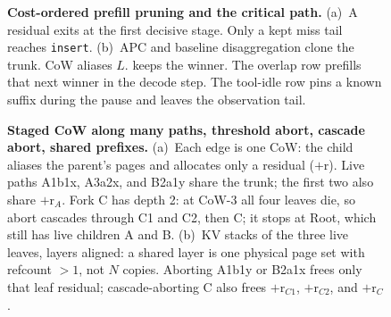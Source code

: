 \begin{figure}[t]
\centering
\resizebox{\textwidth}{!}{}
\caption{\textbf{Cost-ordered prefill pruning and the critical path.}
(a)~A residual exits at the first decisive stage. Only a kept miss tail reaches \texttt{insert}.
(b)~APC and baseline disaggregation clone the trunk. CoW aliases $L$. \app{} keeps the winner.
The overlap row prefills that next winner in the decode step. The tool-idle row pins a known suffix during the pause and leaves the observation tail.}
\label{fig:app}
\end{figure}

\begin{figure}[t]
\centering
\resizebox{\textwidth}{!}{}
\caption{\textbf{Staged CoW along many paths, threshold abort, cascade abort, shared prefixes.}
(a)~Each edge is one CoW: the child aliases the parent's pages and allocates only a residual ($+$r).
Live paths A1b1x, A3a2x, and B2a1y share the trunk; the first two also share $+$r$_A$.
Fork C has depth 2: at CoW-3 all four leaves die, so abort cascades through C1 and C2, then C; it stops at Root, which still has live children A and B.
(b)~KV stacks of the three live leaves, layers aligned: a shared layer is one physical page set with refcount ${>}1$, not $N$ copies.
Aborting A1b1y or B2a1x frees only that leaf residual; cascade-aborting C also frees $+$r$_{C1}$, $+$r$_{C2}$, and $+$r$_C$.}
\label{fig:tree}
\end{figure}

